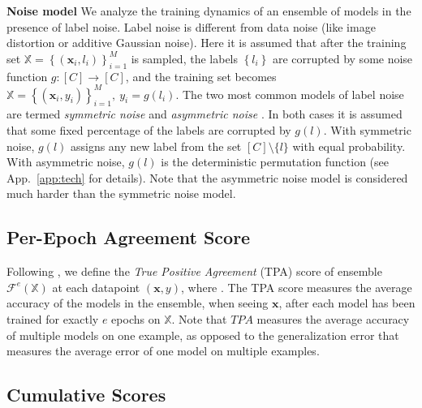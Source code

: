 \documentclass{article}
\newcommand{\bx}{\bm{x}}
\newcommand{\F}{\mathcal{F}}
\newcommand{\iX}{\mathbb{X}}
\newcommand{\myparagpar}[1]{\noindent\textbf{#1}}
\begin{document}
\myparagpar{Noise model} We analyze the training dynamics of an ensemble of models in the presence of label noise. Label noise is different from data noise (like image distortion or additive Gaussian noise). Here it is assumed that after the training set $\iX = \left\{(\bx_i,l_i)\right \}_{i=1}^M$ is sampled, the labels $\left\{l_i\right \}$ are corrupted by some noise function $g:[C]\to[C]$, and the training set becomes $\iX = \left\{(\bx_i,y_i)\right \}_{i=1}^M,~y_i=g(l_i)$. The two most common models of label noise are termed \emph{symmetric noise} and \emph{asymmetric noise} \citep{patrini2017making}. In both cases it is assumed that some fixed percentage of the labels are corrupted by $g(l)$. With symmetric noise, $g(l)$ assigns any new label from the set $[C]\setminus\{l\}$ with equal probability. With asymmetric noise, $g(l)$ is the deterministic permutation function (see App.~\ref{app:tech} for details). Note that the asymmetric noise model is considered much harder than the symmetric noise model. 

\vspace{-.5em}
\subsection{Per-Epoch Agreement Score}
\label{sec:per-epoch}


Following \cite{hacohen2020let}, we define the \textit{True Positive Agreement} (TPA) score of ensemble $\F^e(\iX)$ at each datapoint $(\bx,y)$, where \fbox{$TPA(\bx,y;\F^e(\iX)) = \frac{1}{N}\sum_{i=1}^{N}\mathbbm{1}_{[f_{i}^{e}(\bx) = y]}$}.
The TPA score measures the average accuracy of the models in the ensemble, when seeing $\bx$, after each model has been trained for exactly $e$ epochs on $\iX$. Note that $TPA$ measures the average accuracy of multiple models on one example, as opposed to the generalization error that measures the average error of one model on multiple examples. 
\vspace{-.5em}
\subsection{Cumulative Scores}
\label{sec:cum-scores}
\end{document}
